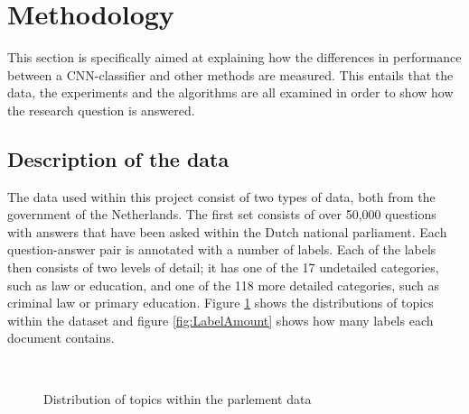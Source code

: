 \section{Methodology}
\label{sec:meth}
This section is specifically aimed at explaining how the differences in performance between a CNN-classifier and other methods are measured. This entails that the data, the experiments and the algorithms are all examined in order to show how the research question is answered. \\


\subsection{Description of the data}
\label{subsec:data}
The data used within this project consist of two types of data, both from the government of the Netherlands. The first set consists of over 50,000 questions with answers that have been asked within the Dutch national parliament. Each question-answer pair is annotated with a number of labels. Each of the labels then consists of two levels of detail; it has one of the 17 undetailed categories, such as law or education, and one of the 118 more detailed categories, such as criminal law or primary education. Figure \ref{fig:distributiontopics} shows the distributions of topics within the dataset and figure \ref{fig:LabelAmount} shows how many labels each document contains.\\

\begin{figure}[H]
	\begin{center}
		~
		\caption{Distribution of topics within the parlement data}
		\label{fig:distributiontopics}
	\end{center}
\end{figure}

